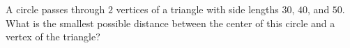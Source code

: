 A circle passes through $2$ vertices of a triangle with side lengths $30$, $40$, and $50$. What is the smallest possible distance between the center of this circle and a vertex of the triangle?
